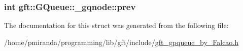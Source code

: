 \subsubsection[{\texorpdfstring{prev}{prev}}]{\setlength{\rightskip}{0pt plus 5cm}int gft\+::\+G\+Queue\+::\+\_\+gqnode\+::prev}\hypertarget{structgft_1_1GQueue_1_1__gqnode_ab9f8ff22b56ce8c4b8aeedec3d87046b}{}\label{structgft_1_1GQueue_1_1__gqnode_ab9f8ff22b56ce8c4b8aeedec3d87046b}


The documentation for this struct was generated from the following file\+:\begin{DoxyCompactItemize}
\item 
/home/pmiranda/programming/lib/gft/include/\hyperlink{gft__gpqueue__by__Falcao_8h}{gft\+\_\+gpqueue\+\_\+by\+\_\+\+Falcao.\+h}\end{DoxyCompactItemize}
